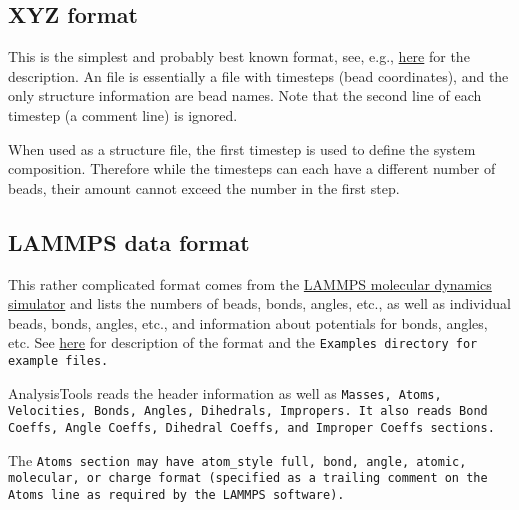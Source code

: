 \subsection{XYZ format}\label{ssec:StructXyz} %

This is the simplest and probably best known format, see, e.g.,
\href{https://openbabel.org/docs/dev/FileFormats/XYZ_cartesian_coordinates_format.html}{here}
for the description. An \xyz file is essentially a file with timesteps (bead
coordinates), and the only structure information are bead names. Note that the
second line of each timestep (a comment line) is ignored.

When used as a structure file, the first timestep is used to define the system
composition. Therefore while the timesteps can each have a different number of
beads, their amount cannot exceed the number in the first step.


\subsection{LAMMPS data format}\label{ssec:StructLdata} %

This rather complicated format comes from the
\href{https://lammps.sandia.gov/}{LAMMPS molecular dynamics simulator} and lists
the numbers of beads, bonds, angles, etc., as well as individual beads, bonds,
angles, etc., and information about potentials for bonds, angles, etc. See
\href{https://docs.lammps.org/2001/data_format.html}{here} for description of
the format and the \tt{Examples} directory for example files.

AnalysisTools reads the header information as well as \tt{Masses}, \tt{Atoms},
\tt{Velocities}, \tt{Bonds}, \tt{Angles}, \tt{Dihedrals}, \tt{Impropers}. It
also reads \tt{Bond Coeffs}, \tt{Angle Coeffs}, \tt{Dihedral Coeffs}, and
\tt{Improper Coeffs} sections.

The \tt{Atoms} section may have \tt{atom_style full}, \tt{bond}, \tt{angle},
\tt{atomic}, \tt{molecular}, or \tt{charge} format (specified as a trailing
comment on the \tt{Atoms} line as required by the \tt{LAMMPS} software).

